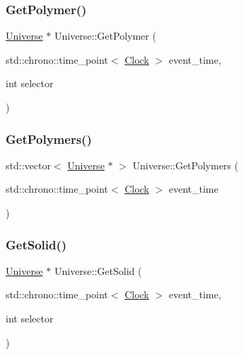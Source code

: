 \mbox{\label{classUniverse_a2d5d3924a7d7ffd2a5f47be9f137d86e}} 
\subsubsection{\texorpdfstring{Get\+Polymer()}{GetPolymer()}}
{\footnotesize\ttfamily \mbox{\hyperlink{classUniverse}{Universe}} $\ast$ Universe\+::\+Get\+Polymer (\begin{DoxyParamCaption}\item[{std\+::chrono\+::time\+\_\+point$<$ \mbox{\hyperlink{universe_8h_a0ef8d951d1ca5ab3cfaf7ab4c7a6fd80}{Clock}} $>$}]{event\+\_\+time,  }\item[{int}]{selector }\end{DoxyParamCaption})}

\mbox{\label{classUniverse_aac5d1c1a3a3ba56c8ca7115a85b2c239}} 
\subsubsection{\texorpdfstring{Get\+Polymers()}{GetPolymers()}}
{\footnotesize\ttfamily std\+::vector$<$ \mbox{\hyperlink{classUniverse}{Universe}} $\ast$ $>$ Universe\+::\+Get\+Polymers (\begin{DoxyParamCaption}\item[{std\+::chrono\+::time\+\_\+point$<$ \mbox{\hyperlink{universe_8h_a0ef8d951d1ca5ab3cfaf7ab4c7a6fd80}{Clock}} $>$}]{event\+\_\+time }\end{DoxyParamCaption})}

\mbox{\label{classUniverse_a9f7b74fc21d45ddaa78aa18e9a337bcd}} 
\subsubsection{\texorpdfstring{Get\+Solid()}{GetSolid()}}
{\footnotesize\ttfamily \mbox{\hyperlink{classUniverse}{Universe}} $\ast$ Universe\+::\+Get\+Solid (\begin{DoxyParamCaption}\item[{std\+::chrono\+::time\+\_\+point$<$ \mbox{\hyperlink{universe_8h_a0ef8d951d1ca5ab3cfaf7ab4c7a6fd80}{Clock}} $>$}]{event\+\_\+time,  }\item[{int}]{selector }\end{DoxyParamCaption})}

